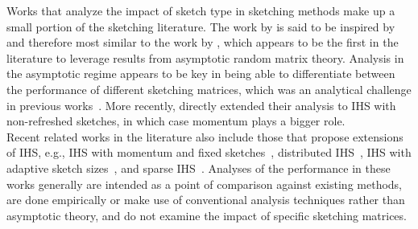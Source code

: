 Works that analyze the impact of sketch type in sketching methods make up a small portion of the sketching literature. The work by \citet{Lacotte:2020} is said to be inspired by and therefore most similar to the work by \citet{Dobriban:2019}, which appears to be the first in the literature to leverage results from asymptotic random matrix theory. Analysis in the asymptotic regime appears to be key in being able to differentiate between the performance of different sketching matrices, which was an analytical challenge in previous works~\citep{Choromanski:2017,Pilanci:2016,Raskutti:2016}. More recently, \citet{Lacotte:2020b} directly extended their analysis to IHS with non-refreshed sketches, in which case momentum plays a bigger role.
\\

Recent related works in the literature also include those that propose extensions of IHS, e.g., IHS with momentum and fixed sketches~\citep{Ozaslan:2019}, distributed IHS~\citep{Derezinski:2020}, IHS with adaptive sketch sizes~\citep{Lacotte:2021}, and sparse IHS~\citep{Derezinski:2021}. Analyses of the performance in these works generally are intended as a point of comparison against existing methods, are done empirically or make use of conventional analysis techniques rather than asymptotic theory, and do not examine the impact of specific sketching matrices.